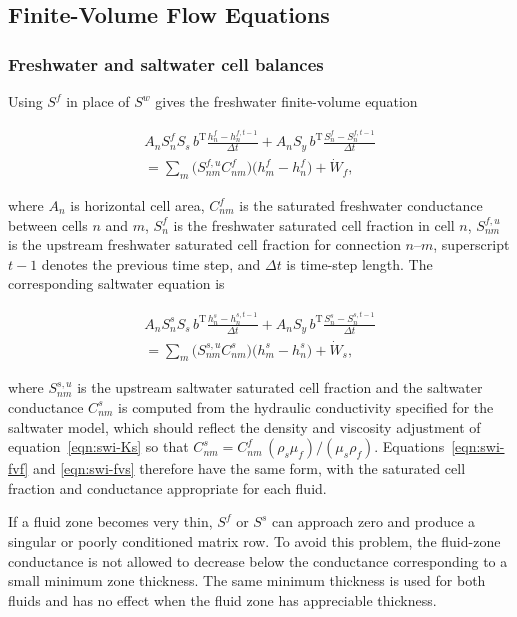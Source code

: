 \subsection{Finite-Volume Flow Equations}

\subsubsection{Freshwater and saltwater cell balances}

Using $S^{f}$ in place of $S^{w}$ gives the freshwater finite-volume equation

\begin{multline}
\label{eqn:swi-fvf}
A_{n}S_{n}^{f}S_{s}\,b^{\mathrm{T}}\frac{h_{n}^{f}-h_{n}^{f,t-1}}{\Delta t}
+A_{n}S_{y}\,b^{\mathrm{T}}\frac{S_{n}^{f}-S_{n}^{f,t-1}}{\Delta t}\\
=\sum_{m}\big(S_{nm}^{f,u}C_{nm}^{f}\big)\big(h_{m}^{f}-h_{n}^{f}\big)+\dot W_{f},
\end{multline}

\noindent where $A_{n}$ is horizontal cell area, $C_{nm}^{f}$ is the saturated freshwater conductance between cells $n$ and $m$, $S_{n}^{f}$ is the freshwater saturated cell fraction in cell $n$, $S_{nm}^{f,u}$ is the upstream freshwater saturated cell fraction for connection $n$--$m$, superscript $t-1$ denotes the previous time step, and $\Delta t$ is time-step length. The corresponding saltwater equation is

\begin{multline}
\label{eqn:swi-fvs}
A_{n}S_{n}^{s}S_{s}\,b^{\mathrm{T}}\frac{h_{n}^{s}-h_{n}^{s,t-1}}{\Delta t}
+A_{n}S_{y}\,b^{\mathrm{T}}\frac{S_{n}^{s}-S_{n}^{s,t-1}}{\Delta t}\\
=\sum_{m}\big(S_{nm}^{s,u}C_{nm}^{s}\big)\big(h_{m}^{s}-h_{n}^{s}\big)+\dot W_{s},
\end{multline}

\noindent where $S_{nm}^{s,u}$ is the upstream saltwater saturated cell fraction and the saltwater conductance $C_{nm}^{s}$ is computed from the hydraulic conductivity specified for the saltwater model, which should reflect the density and viscosity adjustment of equation~\ref{eqn:swi-Ks} so that $C_{nm}^{s}=C_{nm}^{f}\,(\rho_{s}\mu_{f})/(\mu_{s}\rho_{f})$. Equations~\ref{eqn:swi-fvf} and \ref{eqn:swi-fvs} therefore have the same form, with the saturated cell fraction and conductance appropriate for each fluid.

If a fluid zone becomes very thin, $S^{f}$ or $S^{s}$ can approach zero and produce a singular or poorly conditioned matrix row. To avoid this problem, the fluid-zone conductance is not allowed to decrease below the conductance corresponding to a small minimum zone thickness. The same minimum thickness is used for both fluids and has no effect when the fluid zone has appreciable thickness.

